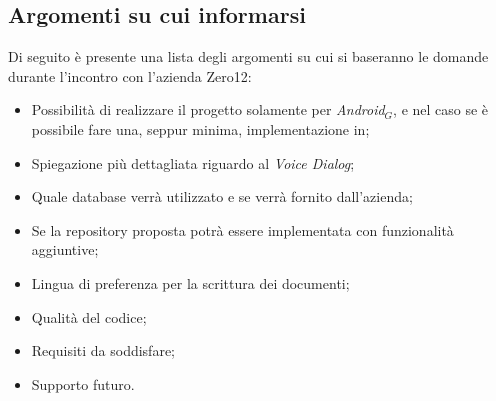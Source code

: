 \documentclass[a4paper,12pt]{article}
\begin{document}
	\subsection{Argomenti su cui informarsi}
	Di seguito è presente una lista degli argomenti su cui si baseranno le domande durante l'incontro con l'azienda Zero12:
	\begin{itemize}
		\item Possibilità di realizzare il progetto solamente per \textit{Android$_{G}$}, e nel caso se è possibile fare una, seppur minima, implementazione in;
		\item Spiegazione più dettagliata riguardo al \textit{Voice Dialog};
		\item Quale database verrà utilizzato e se verrà fornito dall'azienda;
		\item Se la repository proposta potrà essere implementata con funzionalità aggiuntive;
		\item Lingua di preferenza per la scrittura dei documenti;
		\item Qualità del codice;
		\item Requisiti da soddisfare;
		\item Supporto futuro.
	\end{itemize}
	
	\label{LastPage}
\end{document}
